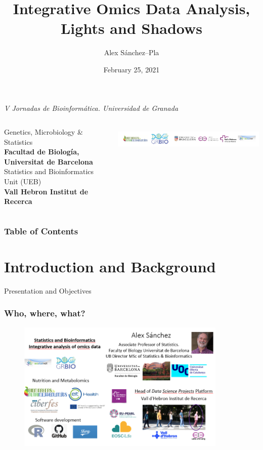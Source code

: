 \documentclass{beamer}
\title{Integrative Omics Data Analysis, \\ Lights and Shadows}
\author{Alex S\'anchez--Pla}
\date{February 25, 2021}
\begin{document}
\begin{frame}
	\begin{scriptsize}
		\begin{center}
			\emph{V Jornadas de Bioinform\'atica. Universidad de Granada}
		\end{center}
	\end{scriptsize}
	
	\titlepage
	
	\begin{columns}
	   \scriptsize
		Genetics, Microbiology \& Statistics\\
		\textbf{Facultad de Biología, Universitat de Barcelona}\\
		Statistics and Bioinformatics Unit (UEB)\\
		\textbf{Vall Hebron Institut de Recerca}
		
		\hfill{}
		\includegraphics[height=1.25cm]{images/alllogos.png}
		
	\end{columns}
\end{frame}



\begin{frame}%
\addtocounter{framenumber}{-1}
\frametitle{Table of Contents}
\tableofcontents
\end{frame}


\section{Introduction and Background}

 
 \begin{frame}
 \begin{center}
{\huge 	Presentation and Objectives	}
 \end{center}
 \end{frame}
  
  \begin{frame}
  	\frametitle{Who, where, what?}
  	 \begin{figure}[ht]
  	 	\centering
  	 	\includegraphics[width=100mm]{images/AlexSanchezPresentation.png}
  	 \end{figure}
  \end{frame}
 
\end{document}
